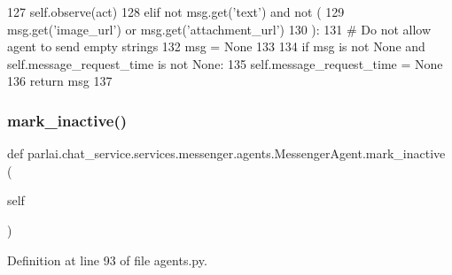 \begin{DoxyCode}
127                 self.observe(act)
128             \textcolor{keywordflow}{elif} \textcolor{keywordflow}{not} msg.get(\textcolor{stringliteral}{'text'}) \textcolor{keywordflow}{and} \textcolor{keywordflow}{not} (
129                 msg.get(\textcolor{stringliteral}{'image\_url'}) \textcolor{keywordflow}{or} msg.get(\textcolor{stringliteral}{'attachment\_url'})
130             ):
131                 \textcolor{comment}{# Do not allow agent to send empty strings}
132                 msg = \textcolor{keywordtype}{None}
133 
134             \textcolor{keywordflow}{if} msg \textcolor{keywordflow}{is} \textcolor{keywordflow}{not} \textcolor{keywordtype}{None} \textcolor{keywordflow}{and} self.message\_request\_time \textcolor{keywordflow}{is} \textcolor{keywordflow}{not} \textcolor{keywordtype}{None}:
135                 self.message\_request\_time = \textcolor{keywordtype}{None}
136         \textcolor{keywordflow}{return} msg
137 
\end{DoxyCode}
\mbox{\label{classparlai_1_1chat__service_1_1services_1_1messenger_1_1agents_1_1MessengerAgent_a54599a1e6c1f72fb4d18775752de3884}} 
\subsubsection{\texorpdfstring{mark\+\_\+inactive()}{mark\_inactive()}}
{\footnotesize\ttfamily def parlai.\+chat\+\_\+service.\+services.\+messenger.\+agents.\+Messenger\+Agent.\+mark\+\_\+inactive (\begin{DoxyParamCaption}\item[{}]{self }\end{DoxyParamCaption})}



Definition at line 93 of file agents.\+py.


